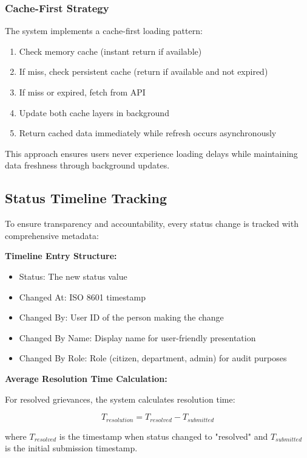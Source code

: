 \documentclass[12pt,a4paper]{article}
\begin{document}
\subsubsection{Cache-First Strategy}

The system implements a cache-first loading pattern:
\begin{enumerate}
    \item Check memory cache (instant return if available)
    \item If miss, check persistent cache (return if available and not expired)
    \item If miss or expired, fetch from API
    \item Update both cache layers in background
    \item Return cached data immediately while refresh occurs asynchronously
\end{enumerate}

This approach ensures users never experience loading delays while maintaining data freshness through background updates.

\subsection{Status Timeline Tracking}

To ensure transparency and accountability, every status change is tracked with comprehensive metadata:

\textbf{Timeline Entry Structure:}
\begin{itemize}
    \item Status: The new status value
    \item Changed At: ISO 8601 timestamp
    \item Changed By: User ID of the person making the change
    \item Changed By Name: Display name for user-friendly presentation
    \item Changed By Role: Role (citizen, department, admin) for audit purposes
\end{itemize}

\textbf{Average Resolution Time Calculation:}

For resolved grievances, the system calculates resolution time:

\begin{equation}
T_{resolution} = T_{resolved} - T_{submitted}
\end{equation}

where $T_{resolved}$ is the timestamp when status changed to "resolved" and $T_{submitted}$ is the initial submission timestamp.
\end{document}
